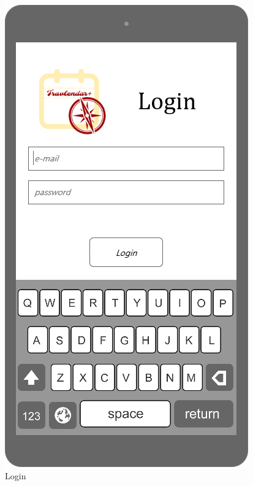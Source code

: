 \documentclass{article}
\begin{document}
\begin{figure}[H]
  \includegraphics[width=\linewidth]{03-login.png}
  \caption{Login}\label{fig:MU3}
\endminipage
\end{figure}
\end{document}

